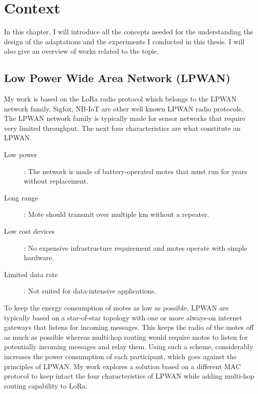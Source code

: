 \chapter{Context\label{section:context}}

In this chapter, I will introduce all the concepts needed for the understanding
the design of the adaptations and
the experiments I conducted in this thesis.
I will also give an overview of works related to the topic.

\section{Low Power Wide Area Network (LPWAN)\label{section:lpwan}}

My work is based on the LoRa radio protocol which belongs to the LPWAN network
family.
Sigfox, NB-IoT are other well known LPWAN radio protocols.
The LPWAN network family is typically made for sensor networks that require
very limited throughput.
The next four characteristics are what constitute an LPWAN.

\begin{description}
  \item[Low power]: The network is made of battery-operated
    motes that must run for years without replacement.
  \item[Long range]: Mote should transmit over multiple km without a repeater.
  \item[Low cost devices]: No expensive infrastructure requirement and motes
    operate with simple hardware.
  \item[Limited data rate]: Not suited for data-intensive applications.
\end{description}

To keep the energy consumption of motes as low as possible, LPWAN are typically
based on a star-of-star topology with one or more always-on internet gateways
that listens for incoming messages.
This keeps the radio of the motes off as much as possible whereas multi-hop routing
would require motes to listen for potentially incoming messages and
relay them.
Using such a scheme, considerably increases the power consumption of each
participant, which goes against the principles of LPWAN.
My work explores a solution based on a different MAC protocol to keep intact the
four characteristics of LPWAN while adding multi-hop routing capability to LoRa.

\paragraph{}

